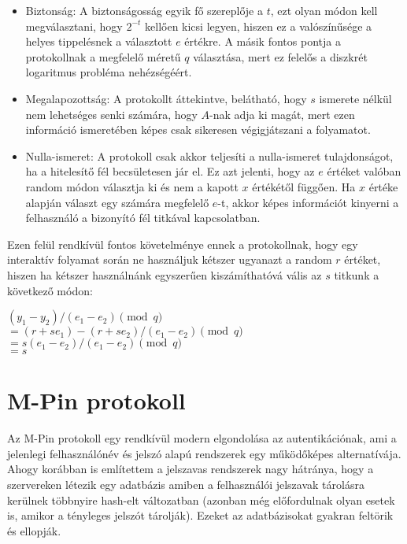 \begin{itemize}
    \item Biztonság: A biztonságosság egyik fő szereplője a $t$, ezt olyan módon kell megválasztani, hogy $2^{-t}$ kellően kicsi legyen, hiszen ez a valószínűsége a helyes tippelésnek a választott $e$ értékre. A másik fontos pontja a protokollnak a megfelelő méretű $q$ választása, mert ez felelős a diszkrét logaritmus probléma nehézségéért.
    \item Megalapozottság: A protokollt áttekintve, belátható, hogy $s$ ismerete nélkül nem lehetséges senki számára, hogy $A$-nak adja ki magát, mert ezen információ ismeretében képes csak sikeresen végigjátszani a folyamatot.
    \item Nulla-ismeret: A protokoll csak akkor teljesíti a nulla-ismeret tulajdonságot, ha a hitelesítő fél becsületesen jár el. Ez azt jelenti, hogy az $e$ értéket valóban random módon választja ki és nem a kapott $x$ értékétől függően. Ha $x$ értéke alapján választ egy számára megfelelő $e$-t, akkor képes információt kinyerni a felhasználó a bizonyító fél titkával kapcsolatban.
\end{itemize}

\begin{minipage}{\textwidth}
Ezen felül rendkívül fontos követelménye ennek a protokollnak, hogy egy interaktív folyamat során ne használjuk kétszer ugyanazt a random $r$ értéket, hiszen ha kétszer használnánk egyszerűen kiszámíthatóvá vális az $s$ titkunk a következő módon:

$(y_1 - y_2) / (e_1 - e_2) \pmod{q}$ \\
$= (r + se_1) - (r + se_2) / (e_1 - e_2) \pmod{q}$ \\
$= s(e_1 - e_2) / (e_1 - e_2) \pmod{q}$ \\
$= s$
\end{minipage}

\section{M-Pin protokoll}

Az M-Pin protokoll \cite{MPin} egy rendkívül modern elgondolása az autentikációnak, ami a jelenlegi felhasználónév és jelszó alapú rendszerek egy működőképes alternatívája. Ahogy korábban is említettem a jelszavas rendszerek nagy hátránya, hogy a szervereken létezik egy adatbázis amiben a felhasználói jelszavak tárolásra kerülnek többnyire hash-elt változatban (azonban még előfordulnak olyan esetek is, amikor a tényleges jelszót tárolják). Ezeket az adatbázisokat gyakran feltörik és ellopják.

